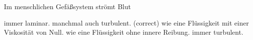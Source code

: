\documentclass[11pt]{exam}
\begin{document}
\begin{questions}
\vspace{3mm}\question Im menschlichen Gefäßsystem strömt Blut

\begin{choices}
	\choice immer laminar.
	\choice manchmal auch turbulent. (correct)
	\choice wie eine Flüssigkeit mit einer Viskosität von Null.
	\choice wie eine Flüssigkeit ohne innere Reibung.
	\choice immer turbulent.
\end{choices}

\vspace{3mm}\end{questions}
\end{document}
